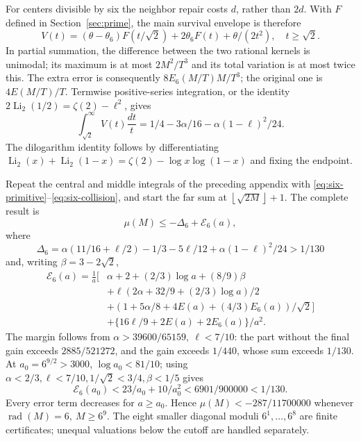 \documentclass[11pt]{article}
\theoremstyle{definition}\newtheorem{definition}[theorem]{Definition}
\theoremstyle{remark}\newtheorem{remark}[theorem]{Remark}
\newcommand{\rad}{\operatorname{rad}}
\newcommand{\floor}[1]{\left\lfloor #1\right\rfloor}
\newcommand{\Li}{\operatorname{Li}_2}
\begin{document}
For centers divisible by six the neighbor repair costs \(d\), rather
than \(2d\). With \(F\) defined in Section~\ref{sec:prime}, the main survival
envelope is therefore
\[
 V(t)=(\theta-\theta_6)F(t/\sqrt2)+2\theta_6F(t)
                                      +\theta/(2t^2),\quad t\ge\sqrt2 .
\]
In partial summation, the difference between the two rational kernels
is unimodal; its maximum is at most \(2M^2/T^3\) and its total variation
is at most twice this. The extra error is consequently
\(8E_6(M/T)M/T^3\); the original one is \(4E(M/T)/T\).
Termwise positive-series integration, or the identity
\(2\Li(1/2)=\zeta(2)-\ell^2\), gives
\[
 \int_{\sqrt2}^{\infty}V(t)\frac{dt}{t}
       =1/4-3\alpha/16-\alpha(1-\ell)^2/24 .
\]
The dilogarithm identity follows by differentiating
\(\Li(x)+\Li(1-x)=\zeta(2)-\log x\log(1-x)\) and fixing the endpoint.

Repeat the central and middle integrals of the preceding appendix with
\eqref{eq:six-primitive}--\eqref{eq:six-collision}, and start the far sum
at \(\floor{\sqrt{2M}}+1\).
The complete result is
\[
 \mu(M)\le-\Delta_6+\mathcal E_6(a),
\]
where
\[
 \Delta_6=\alpha(11/16+\ell/2)-1/3-5\ell/12
                                +\alpha(1-\ell)^2/24>1/130
\]
and, writing \(\beta=3-2\sqrt2\),
\begin{align*}
 \mathcal E_6(a)=\frac1a\bigl[&
 \alpha+2+(2/3)\log a+(8/9)\beta\\
 &+\ell(2\alpha+32/9+(2/3)\log a)/2\\
 &+(1+5\alpha/8+4E(a)+(4/3)E_6(a))/\sqrt2\bigr]\\
 &+\{16\ell/9+2E(a)+2E_6(a)\}/a^2 .
\end{align*}
The margin follows from
\(\alpha>39600/65159,\ \ell<7/10\):
the part without the final gain exceeds \(2885/521272\),
and the gain exceeds \(1/440\), whose sum exceeds \(1/130\).
At \(a_0=6^{9/2}>3000\), \(\log a_0<81/10\);
using \(\alpha<2/3,\ell<7/10,1/\sqrt2<3/4,\beta<1/5\) gives
\[
 \mathcal E_6(a_0)<23/a_0+10/a_0^2<6901/900000<1/130.
\]
Every error term decreases for \(a\ge a_0\). Hence
\(\mu(M)<-287/11700000\) whenever \(\rad(M)=6,\ M\ge6^9\).
The eight smaller diagonal moduli \(6^1,\ldots,6^8\) are finite
certificates; unequal valuations below the cutoff are handled separately.
\end{document}

